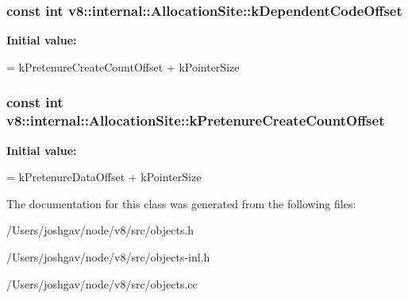 \subsubsection[{\texorpdfstring{k\+Dependent\+Code\+Offset}{kDependentCodeOffset}}]{\setlength{\rightskip}{0pt plus 5cm}const int v8\+::internal\+::\+Allocation\+Site\+::k\+Dependent\+Code\+Offset\hspace{0.3cm}{\ttfamily [static]}}\hypertarget{classv8_1_1internal_1_1_allocation_site_a4c5455657e57dde03629911e0c1fba19}{}\label{classv8_1_1internal_1_1_allocation_site_a4c5455657e57dde03629911e0c1fba19}
{\bfseries Initial value\+:}
\begin{DoxyCode}
=
      kPretenureCreateCountOffset + kPointerSize
\end{DoxyCode}
\subsubsection[{\texorpdfstring{k\+Pretenure\+Create\+Count\+Offset}{kPretenureCreateCountOffset}}]{\setlength{\rightskip}{0pt plus 5cm}const int v8\+::internal\+::\+Allocation\+Site\+::k\+Pretenure\+Create\+Count\+Offset\hspace{0.3cm}{\ttfamily [static]}}\hypertarget{classv8_1_1internal_1_1_allocation_site_ad4371d69986a9a4dad979104ed388710}{}\label{classv8_1_1internal_1_1_allocation_site_ad4371d69986a9a4dad979104ed388710}
{\bfseries Initial value\+:}
\begin{DoxyCode}
=
      kPretenureDataOffset + kPointerSize
\end{DoxyCode}


The documentation for this class was generated from the following files\+:\begin{DoxyCompactItemize}
\item 
/\+Users/joshgav/node/v8/src/objects.\+h\item 
/\+Users/joshgav/node/v8/src/objects-\/inl.\+h\item 
/\+Users/joshgav/node/v8/src/objects.\+cc\end{DoxyCompactItemize}
